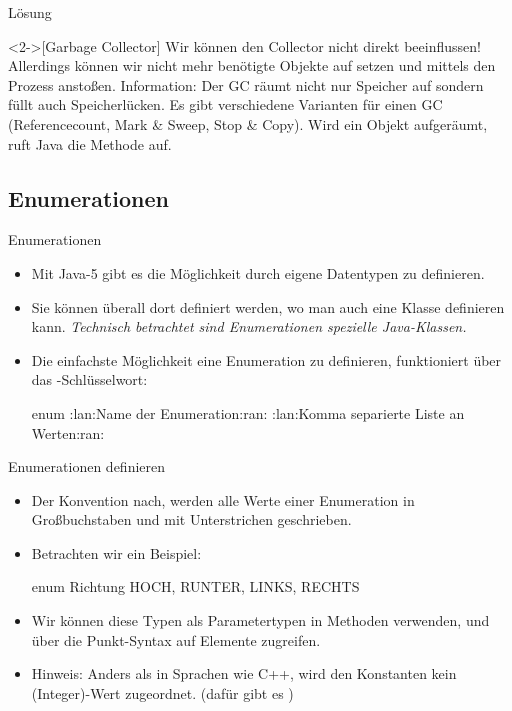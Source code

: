 \ifull
\begin{frame}[c]{Lösung}
    \begin{solve}<2->[Garbage Collector]
        Wir können den Collector nicht direkt beeinflussen!\pause{} Allerdings können wir nicht mehr benötigte Objekte auf  setzen\pause{} und mittels  den Prozess anstoßen.\pause{}\medskip\newline
        Information: Der GC räumt nicht nur Speicher auf sondern füllt auch Speicherlücken.\pause{} Es gibt verschiedene Varianten für einen GC (Referencecount,\pause{} Mark \& Sweep,\pause{} Stop \& Copy).\pause{} Wird ein Objekt aufgeräumt,\pause{} ruft Java die Methode  auf.
    \end{solve}
\end{frame}
\fi

\subsection{Enumerationen}
\begin{frame}[fragile]{Enumerationen}
    \begin{itemize}[<+(1)->]
        \widei
        \item Mit Java-5 gibt es die Möglichkeit durch  eigene Datentypen zu definieren.
        \item Sie können überall dort definiert werden,\pause{} wo man auch eine Klasse definieren kann.\pause{} \textit{Technisch betrachtet sind Enumerationen spezielle Java-Klassen.}
        \item Die einfachste Möglichkeit eine Enumeration zu definieren,\pause{} funktioniert über das -Schlüsselwort:\pause{}
\begin{plainjava}
enum :lan:Name der Enumeration:ran: {
    :lan:Komma separierte Liste an Werten:ran:
}
\end{plainjava}
    \end{itemize}
\end{frame}

\begin{frame}[fragile]{Enumerationen definieren}
    \begin{itemize}[<+(1)->]
        \widei
        \item Der Konvention nach, werden alle Werte einer Enumeration in Großbuchstaben\pause{} und mit Unterstrichen geschrieben.
        \item Betrachten wir ein Beispiel:\pause{}
\begin{plainjava}
enum Richtung {
    HOCH, RUNTER, LINKS, RECHTS
}
\end{plainjava}
        \item Wir können diese Typen als Parametertypen in Methoden verwenden,\pause{} und über die Punkt-Syntax auf Elemente zugreifen.
        \item Hinweis:\pause{} Anders als in Sprachen wie C++,\pause{} wird den Konstanten kein (Integer)-Wert zugeordnet.\pause{} (dafür gibt es )
    \end{itemize}
\end{frame}

